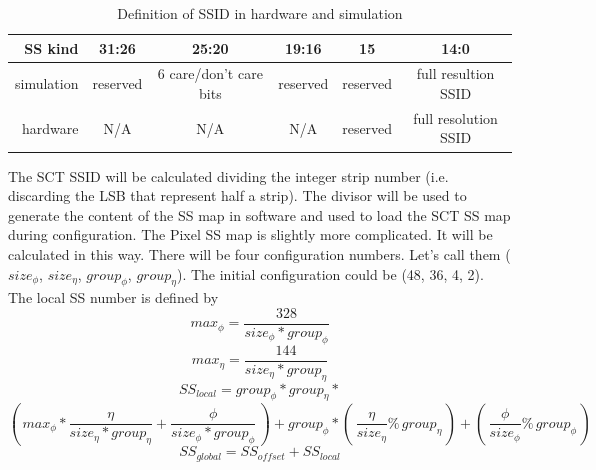 \documentclass[10pt]{article}
\numberwithin{figure}{section}
\numberwithin{equation}{section}
\numberwithin{table}{section}
\newcommand{\0}{\phantom{0}}
\begin{document}
\begin{table}[h]
\begin{tabular}{|r|c|c|c|c|c|}
SS kind & 31:26 & 25:20 & 19:16 & 15 & 14:0 \\ \hline
simulation & reserved & 6 care/don't care bits & reserved & reserved & full resultion SSID \\
hardware & N/A & N/A & N/A & reserved & full resolution SSID \\
\end{tabular}
\caption{\label{tab:SSID_bitwise}Definition of SSID in hardware and simulation}
\end{table}

The SCT SSID will be calculated dividing the integer strip number (i.e. discarding the LSB that represent half a strip). The divisor will be used to generate the content of the SS map in software and used to load the SCT SS map during configuration.
The Pixel SS map is slightly more complicated. It will be calculated in this way.
There will be four configuration numbers. Let's call them ($size_{\phi}$, $size_{\eta}$, $group_{\phi}$, $group_{\eta}$).
The initial configuration could be (48, 36, 4, 2).
The local SS number is defined by
\[ max_{\phi} = \frac{328}{size_{\phi}*group_{\phi}} \]
\[ max_{\eta} = \frac{144}{size_{\eta}*group_{\eta}} \]
\[ SS_{local} = group_{\phi}*group_{\eta} * \]
\[ ( \, max_{\phi}*\frac{\eta}{size_{\eta}*group_{\eta}} + \frac{\phi}{size_{\phi}*group_{\phi}}\, )  + group_{\phi} * ( \, \frac{\eta}{size_{\eta}} \% \, group_{\eta} \, ) + ( \, \frac{\phi}{size_{\phi}} \% \, group_{\phi} \, ) \]
\[ SS_{global} = SS_{offset} + SS_{local} \]
\end{document}
